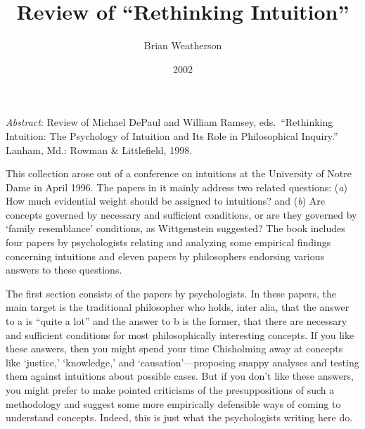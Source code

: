 \documentclass[
  11pt,
  letterpaper,
  DIV=11,
  numbers=noendperiod,
  twoside]{scrartcl}
\title{Review of ``Rethinking Intuition''}
\author{Brian Weatherson}
\date{2002}
\renewenvironment{abstract}
 {\vspace{-1.25cm}
 \quotation\small\noindent\emph{Abstract}:}
 {\endquotation}
\renewenvironment{abstract}
 {\quotation\small\noindent\emph{Abstract}:}
 {\endquotation\vspace{-0.02cm}}
\begin{document}
\maketitle
\begin{abstract}
Review of Michael DePaul and William Ramsey, eds.~``Rethinking
Intuition: The Psychology of Intuition and Its Role in Philosophical
Inquiry.'' Lanham, Md.: Rowman \& Littlefield, 1998.
\end{abstract}


This collection arose out of a conference on intuitions at the
University of Notre Dame in April 1996. The papers in it mainly address
two related questions: (\emph{a}) How much evidential weight should be
assigned to intuitions? and (\emph{b}) Are concepts governed by
necessary and sufficient conditions, or are they governed by `family
resemblance' conditions, as Wittgenstein suggested? The book includes
four papers by psychologists relating and analyzing some empirical
findings concerning intuitions and eleven papers by philosophers
endorsing various answers to these questions.

The first section consists of the papers by psychologists. In these
papers, the main target is the traditional philosopher who holds, inter
alia, that the answer to a is ``quite a lot'' and the answer to b is the
former, that there are necessary and sufficient conditions for most
philosophically interesting concepts. If you like these answers, then
you might spend your time Chisholming away at concepts like `justice,'
`knowledge,' and `causation'---proposing snappy analyses and testing
them against intuitions about possible cases. But if you don't like
these answers, you might prefer to make pointed criticisms of the
presuppositions of such a methodology and suggest some more empirically
defensible ways of coming to understand concepts. Indeed, this is just
what the psychologists writing here do.
\end{document}
